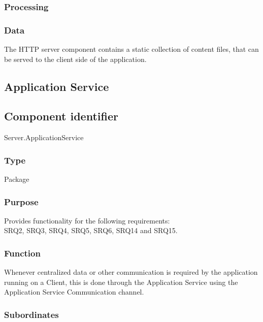 \subsubsection*{Processing}

\subsubsection*{Data}
The HTTP server component contains a static collection of content files, that can be served to the client side of the application.

\subsection{Application Service}
\label{subsec:appservice}

\subsection*{Component identifier}

Server.ApplicationService

\subsubsection*{Type}

Package

\subsubsection*{Purpose}
Provides functionality for the following requirements: \\
SRQ2, SRQ3, SRQ4, SRQ5, SRQ6, SRQ14 and SRQ15.

\subsubsection*{Function}
Whenever centralized data or other communication is required by the application running on a Client, this is done through the Application Service using the Application Service Communication channel.

\subsubsection*{Subordinates}


